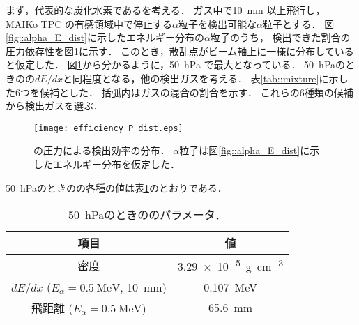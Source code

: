 \documentclass[../master]{subfiles}
\begin{document}
まず，代表的な炭化水素である\Methane を考える．
ガス中で\SI{10}{\milli\metre} 以上飛行し，MAIKo TPC の有感領域中で停止する$\alpha$粒子を検出可能な$\alpha$粒子とする．
図\ref{fig::alpha_E_dist}に示したエネルギー分布の$\alpha$粒子のうち，
検出できた割合の圧力依存性を図\ref{fig::efficiency_P_dist}に示す．
このとき，散乱点がビーム軸上に一様に分布していると仮定した．
図\ref{fig::efficiency_P_dist}から分かるように，\SI{50}{\hecto\pascal} で最大となっている．
\SI{50}{\hecto\pascal}のときの\Methane の$dE/dx$と同程度となる，他の検出ガスを考える．
表\ref{tab::mixture}に示した6つを候補とした．
括弧内はガスの混合の割合を示す．
これらの6種類の候補から検出ガスを選ぶ．
\begin{figure}
  \centering
  \texttt{[image: efficiency\_P\_dist.eps]}
  \caption[\Methane の圧力による検出効率の分布．]
          {\Methane の圧力による検出効率の分布．
            $\alpha$粒子は図\ref{fig::alpha_E_dist}に示したエネルギー分布を仮定した．
           }
  \label{fig::efficiency_P_dist}
\end{figure}
\SI{50}{\hecto\pascal}のときの\Methane の各種の値は表\ref{tab::CH4_50_params}のとおりである．
\begin{table}
  \centering
  \caption{\SI{50}{\hecto\pascal}のときの\Methane のパラメータ．}
  \label{tab::CH4_50_params}
  \begin{tabular}{cc}
    \toprule
    項目 & 値\\
    \midrule
    密度 & \SI{3.29e-5}{\gram\per\cubic\centi\metre} \\
    $dE/dx$ ($E_{\alpha} = \SI{0.5}{\mega\electronvolt}$, \SI{10}{\milli\metre}) & \SI{0.107}{\mega\electronvolt}\\
    飛距離 ($E_{\alpha} = \SI{0.5}{\mega\electronvolt}$) & \SI{65.6}{\milli\metre} \\
    \bottomrule
  \end{tabular}
\end{table}
\end{document}
